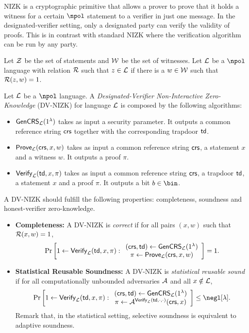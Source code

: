 NIZK is a cryptographic primitive that allows a prover to prove that it holds a witness for a certain $\npol$ statement to a verifier in just one message. In the designated-verifier setting, only a designated party can verify the validity of proofs. This is in contrast with standard NIZK where the verification algorithm can be run by any party.

Let $\mathcal{Z}$ be the set of statements and $\mathcal{W}$ be the set of witnesses. Let $\mathcal{L}$ be a $\npol$ language with relation $\mathcal{R}$ such that $z\in\mathcal{L}$ if there is a $w\in\mathcal{W}$ such that $\mathcal{R}(z,w)=1$.

\begin{definition}[DV-NIZK]
Let $\mathcal{L}$ be a $\npol$ language. A \emph{Designated-Verifier Non-Interactive Zero-Knowledge} (DV-NIZK) for language $\mathcal{L}$ is composed by the following algorithms:
\begin{itemize}
    \item $\mathsf{GenCRS}_{\mathcal{L}}(1^\lambda)$ takes as input a security parameter. It outputs a common reference string $\mathsf{crs} $ together with the corresponding trapdoor $\mathsf{td}$.
    \item $\mathsf{Prove}_{\mathcal{L}}(\mathsf{crs},x,w)$ takes as input a common reference string $\mathsf{crs}$, a statement $x$ and a witness $w$. It outputs a proof $\pi$.
    \item $\mathsf{Verify}_{\mathcal{L}}(\mathsf{td},x,\pi)$ takes as input a common reference string $\mathsf{crs}$, a trapdoor $\mathsf{td}$, a statement $x$ and a proof $\pi$. It outputs a bit $b\in\bin$.
\end{itemize}


A DV-NIZK should fulfill the following properties: completeness, soundness and honest-verifier zero-knowledge.

\begin{itemize}
    \item \textbf{Completeness:} A DV-NIZK is \emph{correct} if for all pairs $(x,w)$ such that $\mathcal{R}(x,w)=1$, $$\Pr\left[1\leftarrow\mathsf{Verify}_{\mathcal{L}}(\mathsf{td},x,\pi):\begin{array}{c}
     (\mathsf{crs},\mathsf{td})\leftarrow\mathsf{GenCRS}_{\mathcal{L}}(1^\lambda)  \\
    \pi\leftarrow\mathsf{Prove}_{\mathcal{L}}(\mathsf{crs},x,w)
\end{array}\right]=1.$$
\item \textbf{Statistical Reusable Soundness:} A DV-NIZK is \emph{statistical reusable sound} if for all computationally unbounded adversaries $\mathcal{A}$ and all $x\notin \mathcal{L}$,  $$\Pr\left[1\leftarrow\Verify_\Lc(\td,x,\pi):\begin{array}{c}
     (\crs,\td)\leftarrow\mathsf{GenCRS}_\Lc(1^\lambda)  \\
    \pi\leftarrow\Ac^{\Verify_\Lc(\td,\cdot,\cdot)}(\crs,x)
\end{array}\right]\leq \negl[\lambda].$$ Remark that, in the statistical setting, selective soundness is equivalent to adaptive soundness.


\end{itemize}
\end{definition}
